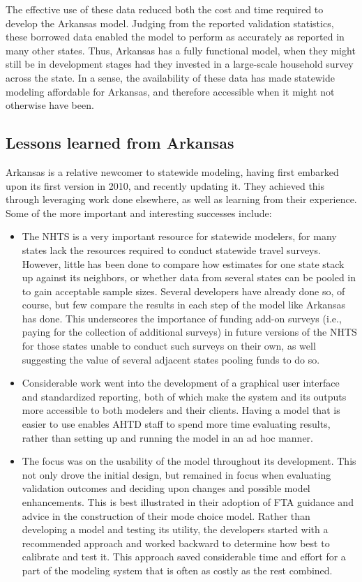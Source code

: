 The effective use of these data reduced both the cost and time required to develop the Arkansas model. Judging from the reported validation statistics, these borrowed data enabled the model to perform as accurately as reported in many other states. Thus, Arkansas has a fully functional model, when they might still be in development stages had they invested in a large-scale household survey across the state. In a sense, the availability of these data has made statewide modeling affordable for Arkansas, and therefore accessible when it might not otherwise have been.

\subsection{Lessons learned from Arkansas}

Arkansas is a relative newcomer to statewide modeling, having first embarked upon its first version in 2010, and recently updating it. They achieved this through leveraging work done elsewhere, as well as learning from their experience. Some of the more important and interesting successes include:

\begin{itemize}
\item
The NHTS is a very important resource for statewide modelers, for many states lack the resources required to conduct statewide travel surveys. However, little has been done to compare how estimates for one state stack up against its neighbors, or whether data from several states can be pooled in to gain acceptable sample sizes. Several developers have already done so, of course, but few compare the results in each step of the model like Arkansas has done. This underscores the importance of funding add-on surveys (i.e., paying for the collection of additional surveys) in future versions of the NHTS for those states unable to conduct such surveys on their own, as well suggesting the value of several adjacent states pooling funds to do so.
\item
Considerable work went into the development of a graphical user interface and standardized reporting, both of which make the system and its outputs more accessible to both modelers and their clients. Having a model that is easier to use enables AHTD staff to spend more time evaluating results, rather than setting up and running the model in an ad hoc manner.
\item
The focus was on the usability of the model throughout its development. This not only drove the initial design, but remained in focus when evaluating validation outcomes and deciding upon changes and possible model enhancements. This is best illustrated in their adoption of FTA guidance and advice in the construction of their mode choice model. Rather than developing a model and testing its utility, the developers started with a recommended approach and worked backward to determine how best to calibrate and test it. This approach saved considerable time and effort for a part of the modeling system that is often as costly as the rest combined.
\end{itemize}

